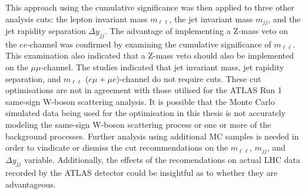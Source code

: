 This approach using the cumulative significance was then applied to three other analysis cuts: the lepton invariant mass $m_{\ell \ell}$, the jet invariant mass $m_{jj}$, and the jet rapidity separation $\Delta y_{jj}$. The advantage of implementing a Z-mass veto on the $ee$-channel was confirmed by examining the cumulative significance of $m_{\ell \ell}$. This examination also indicated that a Z-mass veto should also be implemented on the $\mu\mu$-channel. The studies indicated that jet invariant mass, jet rapidity separation, and $m_{\ell \ell}$ ($e\mu + \mu e$)-channel do not require cuts. These cut optimisations are not in agreement with those utilised for the ATLAS Run 1 same-sign W-boson scattering analysis. It is possible that the Monte Carlo simulated data being used for the optimisation in this thesis is not accurately modeling the same-sign W-boson scattering process or one or more of the background processes. Further analysis using additional MC samples is needed in order to vindicate or dismiss the cut recommendations on the $m_{\ell \ell}$, $m_{jj}$, and  $\Delta y_{jj}$ variable. Additionally, the effects of the recomendations on actual LHC data recorded by the ATLAS detector could be insightful as to whether they are advantageous.